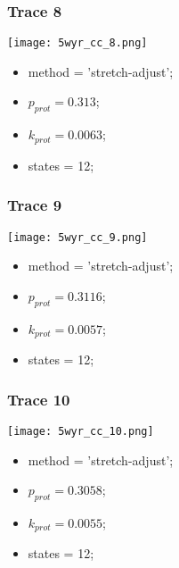 \subsubsection{Trace 8}
\begin{minipage}[c]{0.7\textwidth}
    \texttt{[image: 5wyr\_cc\_8.png]}
\end{minipage}
\hfill
\begin{minipage}[c]{0.45\textwidth}
    \begin{itemize}
        \item method = 'stretch-adjust';
        \item $p_{prot}=0.313$;
        \item $k_{prot}=0.0063$;
        \item states = 12;
    \end{itemize}
\end{minipage}

\subsubsection{Trace 9}
\begin{minipage}[c]{0.7\textwidth}
    \texttt{[image: 5wyr\_cc\_9.png]}
\end{minipage}
\hfill
\begin{minipage}[c]{0.45\textwidth}
    \begin{itemize}
        \item method = 'stretch-adjust';
        \item $p_{prot}=0.3116$;
        \item $k_{prot}=0.0057$;
        \item states = 12;
    \end{itemize}
\end{minipage}

\subsubsection{Trace 10}
\begin{minipage}[c]{0.7\textwidth}
    \texttt{[image: 5wyr\_cc\_10.png]}
\end{minipage}
\hfill
\begin{minipage}[c]{0.45\textwidth}
    \begin{itemize}
        \item method = 'stretch-adjust';
        \item $p_{prot}=0.3058$;
        \item $k_{prot}=0.0055$;
        \item states = 12;
    \end{itemize}
\end{minipage}

